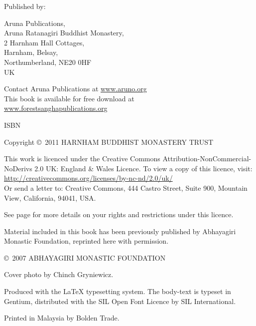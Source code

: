 {\smaller\setlength{\parskip}{0.8em}\setlength{\parindent}{0em}%
{\raggedright%


Published by:

Aruna Publications,\\
Aruna Ratanagiri Buddhist Monastery,\\
2 Harnham Hall Cottages,\\
Harnham, Belsay,\\
Northumberland, NE20 0HF\\
UK

Contact Aruna Publications at \href{http://aruno.org}{www.aruno.org}\\
This book is available for free download at\\
\href{http://forestsanghapublications.org/}{www.forestsanghapublications.org}

ISBN \bookISBN

Copyright \copyright\ 2011 HARNHAM BUDDHIST MONASTERY TRUST

\vfill

{\tiny

This work is licenced under the Creative Commons Attribution-NonCommercial-NoDerivs 2.0 UK: England \& Wales Licence. To view a copy of this licence, visit:\\
\href{http://creativecommons.org/licenses/by-nc-nd/2.0/uk/}{http://creativecommons.org/licenses/by-nc-nd/2.0/uk/}\\
Or send a letter to: Creative Commons, 444 Castro Street, Suite 900, Mountain View, California, 94041, USA.

See page \pageref{cc-details} for more details on your rights and restrictions under this licence.

Material included in this book has been previously published by Abhayagiri Monastic Foundation, reprinted here with permission.

\copyright\ 2007 ABHAYAGIRI MONASTIC FOUNDATION


Cover photo by Chinch Gryniewicz.


Produced with the {\selectfont\LaTeX} typesetting system. The body-text is typeset in Gentium, distributed with the SIL Open Font Licence by SIL International.

\editioninfo

Printed in Malaysia by Bolden Trade.

}

}}

